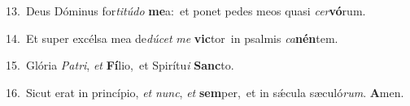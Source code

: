 {\numbfont\textcolor{\numbcolor}{13.}}~Deus Dóminus for\-\textit{ti}\-\textit{tú}\textit{do} \textbf{me}\-a:~\star et ponet pedes meos quasi \textit{cer}\-\textbf{vó}rum.\par
{\numbfont\textcolor{\numbcolor}{14.}}~Et super excélsa mea de\-\textit{dú}\-\textit{cet} \textit{me} \textbf{vic}\-tor~\star in psalmis \textit{ca}\-\textbf{nén}tem.\par
{\numbfont\textcolor{\numbcolor}{15.}}~Glória \textit{Pa}\-\textit{tri}, \textit{et} \textbf{Fí}\-lio,~\star et Spirítu\textit{i} \textbf{Sanc}\-to.\par
{\numbfont\textcolor{\numbcolor}{16.}}~Sicut erat in princípio, \textit{et} \textit{nunc}\-, \textit{et} \textbf{sem}\-per,~\star et in sǽcula sæculó\-\textit{rum}\-. \textbf{A}\-men.\par

